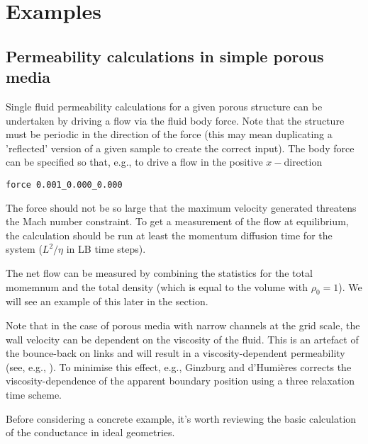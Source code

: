 %
%
%
%
%
%

\section{Examples}
\label{section-examples}

\subsection{Permeability calculations in simple porous media}

Single fluid permeability calculations for a given porous structure
can be undertaken by driving a flow via the fluid body force. Note
that the structure must be periodic in the direction of the force
(this may mean duplicating a 'reflected' version of a given sample
to create the correct input). The body force can be specified so
that, e.g., to drive a flow in the positive $x-$direction
\begin{lstlisting}
force 0.001_0.000_0.000
\end{lstlisting}
The force should not be so large that the maximum velocity generated
threatens the Mach number constraint. To get a measurement of the
flow at equilibrium, the calculation should be run at least the
momentum diffusion time for the system ($L^2/\eta$ in LB time steps).

The net flow can be measured by combining the statistics for the
total momemnum and the total density (which is equal to the volume
with $\rho_0 = 1$). We will see an example of this later in the
section.

Note that in the case of porous media with narrow channels at the grid
scale, the wall velocity can be dependent on the viscosity of the fluid.
This is an artefact of the bounce-back on links and will result in a
viscosity-dependent permeability (see, e.g., \cite{lipanmiller}).
To minimise this effect, e.g.,  Ginzburg and d'Humi\`eres \cite{ginzburg}
corrects the viscosity-dependence of the apparent boundary position
using a three relaxation time scheme.

Before considering a concrete example, it's worth reviewing the basic
calculation of the conductance in ideal geometries.


